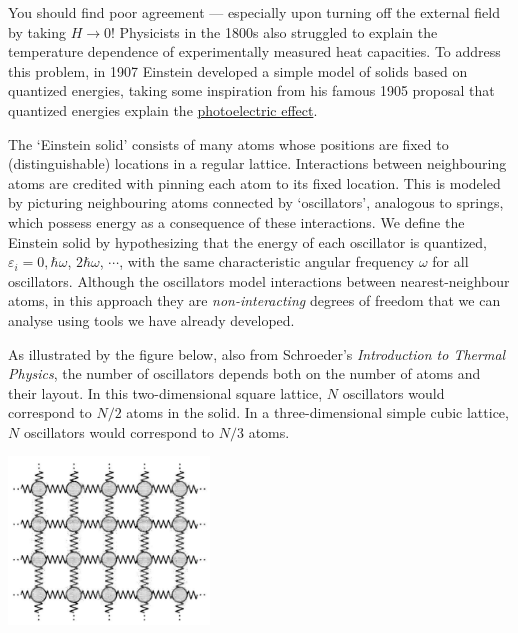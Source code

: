 \documentclass[12 pt]{article} %
\newcommand{\eps}{\ensuremath{\varepsilon} }
\newcommand{\om}{\ensuremath{\omega} }
\begin{document}
You should find poor agreement --- especially upon turning off the external field by taking $H \to 0$!
Physicists in the 1800s also struggled to explain the temperature dependence of experimentally measured heat capacities.
To address this problem, in 1907 Einstein developed a simple model of solids based on quantized energies, taking some inspiration from his famous 1905 proposal that quantized energies explain the \href{https://en.wikipedia.org/wiki/Photoelectric_effect}{photoelectric effect}.

The `Einstein solid' consists of many atoms whose positions are fixed to (distinguishable) locations in a regular lattice.
Interactions between neighbouring atoms are credited with pinning each atom to its fixed location.
This is modeled by picturing neighbouring atoms connected by `oscillators', analogous to springs, which possess energy as a consequence of these interactions.
We define the Einstein solid by hypothesizing that the energy of each oscillator is quantized, $\eps_i = 0, \hbar \om$, $2\hbar \om$, $\cdots$, with the same characteristic angular frequency \om for all oscillators.
Although the oscillators model interactions between nearest-neighbour atoms, in this approach they are \textit{non-interacting} degrees of freedom that we can analyse using tools we have already developed.

As illustrated by the figure below, also from Schroeder's \textit{Introduction to Thermal Physics}, the number of oscillators depends both on the number of atoms and their layout.
In this two-dimensional square lattice, $N$ oscillators would correspond to $N / 2$ atoms in the solid.
In a three-dimensional simple cubic lattice, $N$ oscillators would correspond to $N / 3$ atoms. \\[-24 pt]
\begin{center}\includegraphics[width=0.4\textwidth]{figs/solid.pdf}\end{center}
\end{document}
